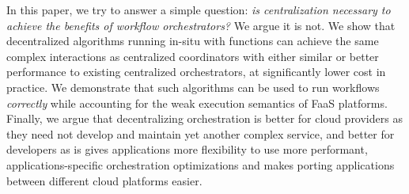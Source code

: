 %



In this paper, we try to answer a simple question: \textit{is centralization
\emph{necessary} to achieve the benefits of workflow  orchestrators?} We argue
it is not. We show that decentralized algorithms running in-situ with functions
can achieve the same complex interactions as centralized coordinators with
either similar or better performance to existing centralized orchestrators, at
significantly lower cost in practice. We demonstrate that such algorithms can be
used to run workflows \emph{correctly} while accounting for the weak execution
semantics of FaaS platforms. Finally, we argue that decentralizing orchestration
is better for cloud providers as they need not develop and maintain yet another
complex service, and better for developers as is gives applications more
flexibility to use more performant, applications-specific orchestration
optimizations and makes porting applications between different cloud platforms
easier.

